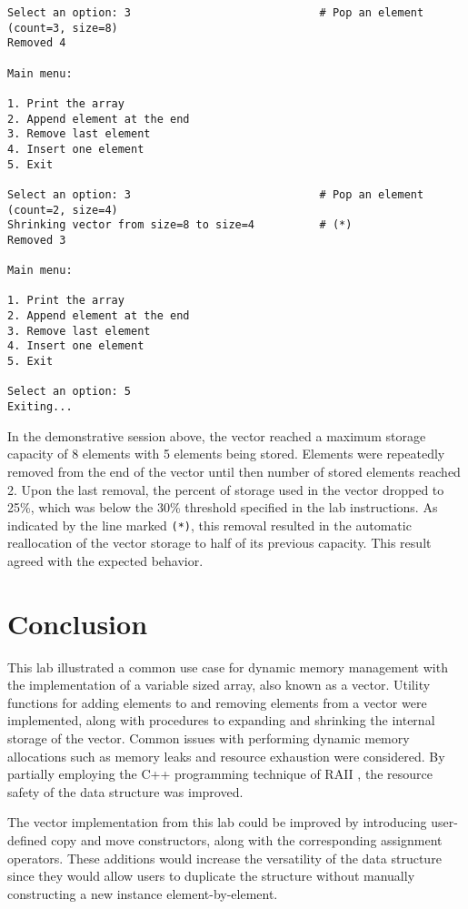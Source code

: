 \documentclass[11pt, letterpaper]{article} %
\begin{document}
\begin{lstlisting}[style=labreportstyle-sh]
Select an option: 3                             # Pop an element (count=3, size=8)
Removed 4

Main menu:

1. Print the array
2. Append element at the end
3. Remove last element
4. Insert one element
5. Exit

Select an option: 3                             # Pop an element (count=2, size=4)
Shrinking vector from size=8 to size=4          # (*)
Removed 3

Main menu:

1. Print the array
2. Append element at the end
3. Remove last element
4. Insert one element
5. Exit

Select an option: 5
Exiting...
\end{lstlisting}

In the demonstrative session above, the vector reached a maximum storage capacity of 8 elements with 5 elements being stored. Elements were repeatedly removed from the end of the vector until then number of stored elements reached 2. Upon the last removal, the percent of storage used in the vector dropped to 25\%, which was below the 30\% threshold specified in the lab instructions. As indicated by the line marked \texttt{(*)}, this removal resulted in the automatic reallocation of the vector storage to half of its previous capacity. This result agreed with the expected behavior.


\section*{Conclusion}

This lab illustrated a common use case for dynamic memory management with the implementation of a variable sized array, also known as a vector. Utility functions for adding elements to and removing elements from a vector were implemented, along with procedures to expanding and shrinking the internal storage of the vector. Common issues with performing dynamic memory allocations such as memory leaks and resource exhaustion were considered. By partially employing the C++ programming technique of RAII \cite{cppreference-raii}, the resource safety of the data structure was improved.

The vector implementation from this lab could be improved by introducing user-defined copy and move constructors, along with the corresponding assignment operators. These additions would increase the versatility of the data structure since they would allow users to duplicate the structure without manually constructing a new instance element-by-element.
\end{document}
